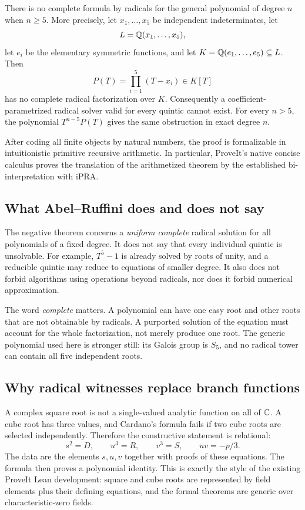 \begin{theorem}
\label{thm:abel-main}
There is no complete formula by radicals for the general polynomial of degree
$n$ when $n\ge5$.  More precisely, let $x_1,\ldots,x_5$ be independent
indeterminates, let
\[
 L=\mathbb Q(x_1,\ldots,x_5),
\]
let $e_i$ be the elementary symmetric functions, and let
$K=\mathbb Q(e_1,\ldots,e_5)\subseteq L$.  Then
\[
 P(T)=\prod_{i=1}^{5}(T-x_i)\in K[T]
\]
has no complete radical factorization over $K$.  Consequently a coefficient-
parametrized radical solver valid for every quintic cannot exist.  For every
$n>5$, the polynomial $T^{n-5}P(T)$ gives the same obstruction in exact degree
$n$.

After coding all finite objects by natural numbers, the proof is formalizable
in intuitionistic primitive recursive arithmetic.  In particular, ProveIt's
native concise calculus proves the translation of the arithmetized theorem by
the established bi-interpretation with iPRA.
\end{theorem}

\subsection{What Abel--Ruffini does and does not say}

The negative theorem concerns a \emph{uniform complete} radical solution for
all polynomials of a fixed degree.  It does not say that every individual
quintic is unsolvable.  For example, $T^5-1$ is already solved by roots of
unity, and a reducible quintic may reduce to equations of smaller degree.  It
also does not forbid algorithms using operations beyond radicals, nor does it
forbid numerical approximation.

The word \emph{complete} matters.  A polynomial can have one easy root and
other roots that are not obtainable by radicals.  A purported solution of the
equation must account for the whole factorization, not merely produce one
root.  The generic polynomial used here is stronger still: its Galois group is
$S_5$, and no radical tower can contain all five independent roots.

\subsection{Why radical witnesses replace branch functions}

A complex square root is not a single-valued analytic function on all of
$\mathbb C$.  A cube root has three values, and Cardano's formula fails if two cube
roots are selected independently.  Therefore the constructive statement is
relational:
\[
  s^2=D,
  \qquad u^3=R,
  \qquad v^3=S,
  \qquad uv=-p/3.
\]
The data are the elements $s,u,v$ together with proofs of these equations.
The formula then proves a polynomial identity.  This is exactly the style of
the existing ProveIt Lean development: square and cube roots are represented
by field elements plus their defining equations, and the formal theorems are
generic over characteristic-zero fields.

